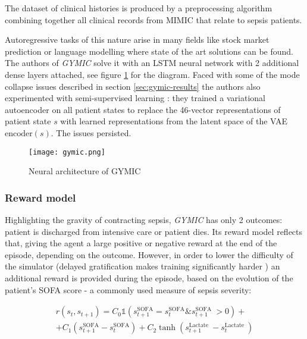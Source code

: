 The dataset of clinical histories is produced by a preprocessing algorithm combining together all clinical records from MIMIC that relate to sepsis patients.

Autoregressive tasks of this nature arise in many fields like stock market prediction \cite{stonks1,stonks2} or language modelling \cite{langmodels} where state of the art solutions can be found.
The authors of \emph{GYMIC} solve it with an LSTM \cite{hochreiterLongShorttermMemory1997} neural network with 2 additional dense layers attached, see figure \ref{fig:gymic} for the diagram.
Faced with some of the mode collapse issues described in section \ref{sec:gymic-results} the authors also experimented with semi-supervised learning \cite{semi-supervised}: they trained a variational autoencoder \cite{vae} on all patient states to replace the 46-vector representations of patient state $s$ with learned representations from the latent space of the VAE $\text{encoder}(s)$.
The issues persisted.

\begin{figure}
    \centering
    \texttt{[image: gymic.png]}
    \caption{Neural architecture of GYMIC}
    \label{fig:gymic}
\end{figure}

\subsubsection{Reward model}

Highlighting the gravity of contracting sepsis, \emph{GYMIC} has only 2 outcomes: patient is discharged from intensive care or patient dies.
Its reward model reflects that, giving the agent a large positive or negative reward at the end of the episode, depending on the outcome.
However, in order to lower the difficulty of the simulator (delayed gratification makes training significantly harder \cite{delayedgrat-humans, delayedgrat-ai}) an additional reward is provided during the episode, based on the evolution of the patient's SOFA score \cite{sofa} - a commonly used measure of sepsis severity:

\begin{multline}
r\left(s_{t}, s_{t+1}\right)=C_{0} \mathbb{1}\left(s_{t+1}^{\mathrm{SOFA}}=s_{t}^{\mathrm{SOFA}} \& s_{t+1}^{\text {SOFA }}>0\right) + \\ +
C_{1}\left(s_{t+1}^{\mathrm{SOFA}}-s_{t}^{\mathrm{SOFA}}\right) + 
C_{2} \tanh \left(s_{t+1}^{\text {Lactate }}-s_{t}^{\text {Lactate }}\right)
\end{multline}

